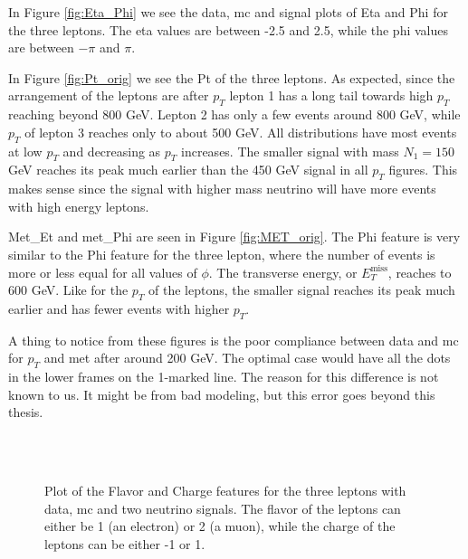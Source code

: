 \documentclass[a4paper, american, 12pt]{report}
\begin{document}
	In Figure \ref{fig:Eta_Phi} we see the data, \acrshort{mc} and signal plots of Eta and Phi for the three leptons. The eta values are between -2.5 and 2.5, while the phi values are between $-\pi$ and $\pi$.
	
	In Figure \ref{fig:Pt_orig} we see the Pt of the three leptons. As expected, since the arrangement of the leptons are after $p_T$ lepton 1 has a long tail towards high $p_T$ reaching beyond 800 GeV. Lepton 2 has only a few events around 800 GeV, while $p_T$ of lepton 3 reaches only to about 500 GeV. All distributions have most events at low $p_T$ and decreasing as $p_T$ increases. The smaller signal with mass $N_1=150$ GeV reaches its peak much earlier than the 450 GeV signal in all $p_T$ figures. This makes sense since the signal with higher mass neutrino will have more events with high energy leptons.
	
	Met\_Et and met\_Phi are seen in Figure \ref{fig:MET_orig}. The Phi feature is very similar to the Phi feature for the three lepton, where the number of events is more or less equal for all values of $\phi$. The transverse energy, or $E_T^{\text{miss}}$, reaches to 600 GeV. Like for the $p_T$ of the leptons, the smaller signal reaches its peak much earlier and has fewer events with higher $p_T$.
	
	A thing to notice from these figures is the poor compliance between data and \acrshort{mc} for $p_T$ and \acrshort{met} after around 200 GeV. The optimal case would have all the dots in the lower frames on the 1-marked line. The reason for this difference is not known to us. It might be from bad modeling, but this error goes beyond this thesis.
	
	\begin{figure}[h!]
		\vspace*{-4.5cm}
		\hspace*{-1.cm}
		\\
		\hspace*{-1.cm}
		\\
		\hspace*{-1.cm}
		\caption[Flavor and Charge plots for the three leptons.]{Plot of the Flavor and Charge features for the three leptons with data, \acrshort{mc} and two neutrino signals. The flavor of the leptons can either be 1 (an electron) or 2 (a muon), while the charge of the leptons can be either -1 or 1. \label{fig:Flavor_Charge}}
	\end{figure}
	
\end{document}

